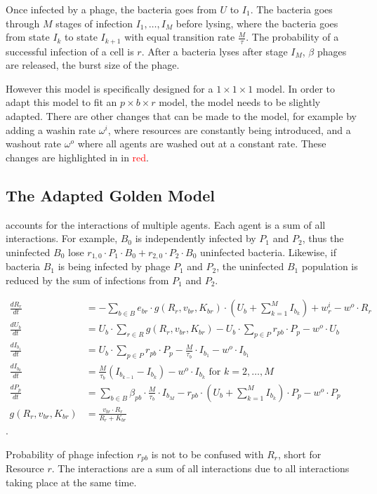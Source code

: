 Once infected by a phage, the bacteria goes from $U$ to $I_1$. 
The bacteria goes through $M$ stages of infection $I_1, \dots, I_M$ before lysing, where the bacteria goes from state $I_k$ to state $I_{k+1}$ with equal transition rate $\frac{M}{\tau}$. The probability of a successful infection of a cell is $r$. 
After a bacteria lyses after stage $I_M$, $\beta$ phages are released, the burst size of the phage. 

However this model is specifically designed for a $1\times 1 \times 1$ model. 
In order to adapt this model to fit an $p \times b \times r$ model, the model needs to be slightly adapted. 
There are other changes that can be made to the model, for example by adding a washin rate $\omega^{i}$, where resources are constantly being introduced, and a washout rate $\omega^{o}$ where all agents are washed out at a constant rate. 
These changes are highlighted in  in \textcolor{red}{red}. 

\subsection{The Adapted Golden Model}
\label{sec:adapted_golden_model}
 accounts for the interactions of multiple agents. 
Each agent is a sum of all interactions. 
For example, $B_0$ is independently infected by $P_1$ and $P_2$, thus the uninfected $B_0$ lose $r_{1, 0} \cdot P_1 \cdot B_0 + r_{2, 0} \cdot P_2 \cdot B_0$ uninfected bacteria. 
Likewise, if bacteria $B_1$ is being infected by phage $P_1$ and $P_2$, the uninfected $B_1$ population is reduced by the sum of infections from $P_1$ and $P_2$. 
\begin{eqfloat}
    \begin{align}
        \frac{dR_r}{dt} &= -\sum_{b \in B} e_{b r} \cdot g(R_r, v_{b r}, K_{b r})\cdot (U_b + \sum_{k=1}^{M} I_{b_k}) + w^i_r - w^o \cdot R_r\\
        \frac{dU_b}{dt} &= U_b \cdot \sum_{r \in R} g(R_r, v_{b r}, K_{b r}) - U_b \cdot \sum_{p \in P} r_{p b} \cdot P_p - w^o \cdot U_b\\
        \frac{dI_{b_1}}{dt} &= U_b \cdot \sum_{p \in P}r_{p b} \cdot P_p - \frac{M}{\tau_b}\cdot I_{b_1} - w^o \cdot I_{b_1}\\
        \frac{dI_{b_k}}{dt} &= \frac{M}{\tau_b}(I_{b_{k-1}}-I_{b_k}) - w^o \cdot I_{b_k}\text{ for } k=2, \dots, M \\
        \frac{dP_p}{dt} &= \sum_{b\in B}\beta_{p b}\cdot\frac{M}{\tau_b} \cdot I_{b_M} - r_{p b}\cdot(U_b + \sum_{k=1}^{M} I_{b_k})\cdot P_p - w^o \cdot P_p\\
        g(R_r, v_{b r}, K_{b r}) &= \frac{v_{b r} \cdot R_r}{R_r + K_{b r}}
        \label{eq:adapted_golden_model}
    \end{align}. 
    \caption{
        Probability of phage infection $r_{p b}$ is not to be confused with $R_r$, short for Resource $r$. 
        The interactions are a sum of all interactions due to all interactions taking place at the same time. 
    }
\end{eqfloat}

